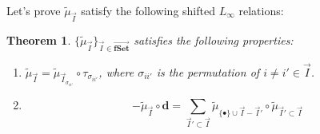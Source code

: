 \documentclass[11pt]{amsart}
\newtheorem{thm}{Theorem}[section]
\theoremstyle{definition}
\theoremstyle{remark}
\numberwithin{equation}{section}
\begin{document}
Let's prove $\tilde{\mu}_{\vec{I}}$ satisfy the following shifted $L_{\infty}$ relations:
\begin{thm}
    $\{\tilde{\mu}_{\vec{I}}\}_{\vec{I}\in \overrightarrow{\mathbf{fSet}}}$ satisfies the following properties:
    \begin{enumerate}
        \item $\tilde{\mu}_{\vec{I}}=\tilde{\mu}_{\vec{I}_{\sigma_{ii'}}}\circ\tau_{\sigma_{ii'}}$, where $\sigma_{ii'}$ is the permutation of $i\neq i'\in\vec{I}$.
        \item 
        $$
        -\tilde{\mu}_{\vec{I}}\circ \mathbf{d}=\sum_{\vec{I}'\subset\vec{I}}\tilde{\mu}_{\{\bullet\}\cup\vec{I}-\vec{I}'}\circ \tilde{\mu}_{\vec{I}'\subset\vec{I}}
        $$
    \end{enumerate}
\end{thm}
\end{document}
